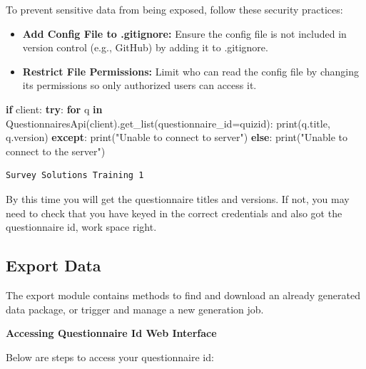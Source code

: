\documentclass[
  letterpaper,
  DIV=11,
  numbers=noendperiod]{scrreprt}
\newenvironment{Shaded}{\begin{snugshade}}{\end{snugshade}}
\newcommand{\BuiltInTok}[1]{\textcolor[rgb]{0.00,0.23,0.31}{#1}}
\newcommand{\ControlFlowTok}[1]{\textcolor[rgb]{0.00,0.23,0.31}{\textbf{#1}}}
\newcommand{\KeywordTok}[1]{\textcolor[rgb]{0.00,0.23,0.31}{\textbf{#1}}}
\newcommand{\NormalTok}[1]{\textcolor[rgb]{0.00,0.23,0.31}{#1}}
\newcommand{\OperatorTok}[1]{\textcolor[rgb]{0.37,0.37,0.37}{#1}}
\newcommand{\StringTok}[1]{\textcolor[rgb]{0.13,0.47,0.30}{#1}}
\begin{document}
To prevent sensitive data from being exposed, follow these security
practices:

\begin{itemize}
\item
  \textbf{Add Config File to .gitignore:} Ensure the config file is not
  included in version control (e.g., GitHub) by adding it to .gitignore.
\item
  \textbf{Restrict File Permissions:} Limit who can read the config file
  by changing its permissions so only authorized users can access it.
\end{itemize}

\begin{Shaded}
\begin{Highlighting}[]
\ControlFlowTok{if}\NormalTok{ client:}
  \ControlFlowTok{try}\NormalTok{:}
    \ControlFlowTok{for}\NormalTok{ q }\KeywordTok{in}\NormalTok{ QuestionnairesApi(client).get\_list(questionnaire\_id}\OperatorTok{=}\NormalTok{quizid):}
      \BuiltInTok{print}\NormalTok{(q.title, q.version)}
  \ControlFlowTok{except}\NormalTok{:}
    \BuiltInTok{print}\NormalTok{(}\StringTok{"Unable to connect to server"}\NormalTok{)}
\ControlFlowTok{else}\NormalTok{:}
  \BuiltInTok{print}\NormalTok{(}\StringTok{"Unable to connect to the server"}\NormalTok{)}
\end{Highlighting}
\end{Shaded}

\begin{verbatim}
Survey Solutions Training 1
\end{verbatim}

By this time you will get the questionnaire titles and versions. If not,
you may need to check that you have keyed in the correct credentials and
also got the questionnaire id, work space right.

\subsection{Export Data}\label{export-data}

The export module contains methods to find and download an already
generated data package, or trigger and manage a new generation job.

\textbf{Accessing Questionnaire Id Web Interface}

Below are steps to access your questionnaire id:
\end{document}
